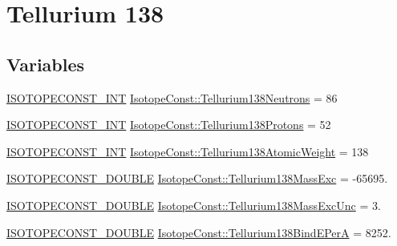 \hypertarget{group___isotope_const-_tellurium-_te138}{}\section{Tellurium 138}
\label{group___isotope_const-_tellurium-_te138}
\subsection*{Variables}
\begin{DoxyCompactItemize}
\item 
\mbox{\hyperlink{group___isotope_const-_macros_ga5f18360b3e99483a35c32d789e62621c}{I\+S\+O\+T\+O\+P\+E\+C\+O\+N\+S\+T\+\_\+\+I\+NT}} \mbox{\hyperlink{group___isotope_const-_tellurium-_te138_ga9e3af60d284ef51f34efcfef036fa589}{Isotope\+Const\+::\+Tellurium138\+Neutrons}} = 86
\item 
\mbox{\hyperlink{group___isotope_const-_macros_ga5f18360b3e99483a35c32d789e62621c}{I\+S\+O\+T\+O\+P\+E\+C\+O\+N\+S\+T\+\_\+\+I\+NT}} \mbox{\hyperlink{group___isotope_const-_tellurium-_te138_ga31e22837207eb301c43be073ffc0ce5f}{Isotope\+Const\+::\+Tellurium138\+Protons}} = 52
\item 
\mbox{\hyperlink{group___isotope_const-_macros_ga5f18360b3e99483a35c32d789e62621c}{I\+S\+O\+T\+O\+P\+E\+C\+O\+N\+S\+T\+\_\+\+I\+NT}} \mbox{\hyperlink{group___isotope_const-_tellurium-_te138_gaa53a82026b334da9ca33cbfe87c6181a}{Isotope\+Const\+::\+Tellurium138\+Atomic\+Weight}} = 138
\item 
\mbox{\hyperlink{group___isotope_const-_macros_ga8f45a7272ce02c0b4c65c44636ed719a}{I\+S\+O\+T\+O\+P\+E\+C\+O\+N\+S\+T\+\_\+\+D\+O\+U\+B\+LE}} \mbox{\hyperlink{group___isotope_const-_tellurium-_te138_gafc2540e058e22eadbe49437291ccd0b4}{Isotope\+Const\+::\+Tellurium138\+Mass\+Exc}} = -\/65695.
\item 
\mbox{\hyperlink{group___isotope_const-_macros_ga8f45a7272ce02c0b4c65c44636ed719a}{I\+S\+O\+T\+O\+P\+E\+C\+O\+N\+S\+T\+\_\+\+D\+O\+U\+B\+LE}} \mbox{\hyperlink{group___isotope_const-_tellurium-_te138_gab69ce9b926ef29d5c8fe11cfee01cfd9}{Isotope\+Const\+::\+Tellurium138\+Mass\+Exc\+Unc}} = 3.
\item 
\mbox{\hyperlink{group___isotope_const-_macros_ga8f45a7272ce02c0b4c65c44636ed719a}{I\+S\+O\+T\+O\+P\+E\+C\+O\+N\+S\+T\+\_\+\+D\+O\+U\+B\+LE}} \mbox{\hyperlink{group___isotope_const-_tellurium-_te138_ga3f3c70818e0069dbb517a8ffa45576d0}{Isotope\+Const\+::\+Tellurium138\+Bind\+E\+PerA}} = 8252.
\item 

\end{DoxyCompactItemize}
